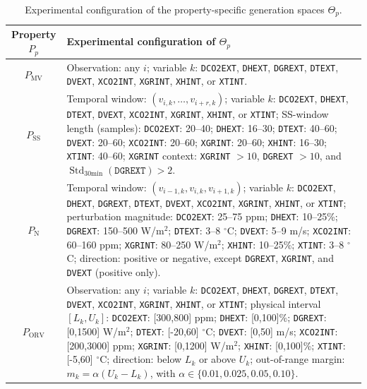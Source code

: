 \documentclass[preprint,12pt]{elsarticle}
\begin{document}
\begin{table}[!t]
\caption{Experimental configuration of the property-specific generation
spaces \(\Theta_p\).}
\label{tab:pbt_generation_config}
\centering

{\scriptsize
\setlength{\tabcolsep}{3pt}
\begin{tabular}{|c|p{10.7cm}|}
\hline
\textbf{Property \(P_p\)} &
\textbf{Experimental configuration of \(\Theta_p\)} \\
\hline
\hline

\(P_{\mathrm{MV}}\) &
Observation: any \(i\);
variable \(k\): \texttt{DCO2EXT}, \texttt{DHEXT}, \texttt{DGREXT},
\texttt{DTEXT}, \texttt{DVEXT}, \texttt{XCO2INT}, \texttt{XGRINT},
\texttt{XHINT}, or \texttt{XTINT}. \\
\hline

\(P_{\mathrm{SS}}\) &
Temporal window: \((v_{i,k},\ldots,v_{i+r,k})\);
variable \(k\): \texttt{DCO2EXT}, \texttt{DHEXT}, \texttt{DTEXT},
\texttt{DVEXT}, \texttt{XCO2INT}, \texttt{XGRINT}, \texttt{XHINT},
or \texttt{XTINT};
SS-window length (samples):
\texttt{DCO2EXT}: 20--40;
\texttt{DHEXT}: 16--30;
\texttt{DTEXT}: 40--60;
\texttt{DVEXT}: 20--60;
\texttt{XCO2INT}: 20--60;
\texttt{XGRINT}: 20--60;
\texttt{XHINT}: 16--30;
\texttt{XTINT}: 40--60;
\texttt{XGRINT} context:
\texttt{XGRINT} \(>10\),
\texttt{DGREXT} \(>10\), and
\(\operatorname{Std}_{30\mathrm{min}}(\texttt{DGREXT})>2\).\\
\hline

\(P_{\mathrm{N}}\) &
Temporal window: \((v_{i-1,k},v_{i,k},v_{i+1,k})\);
variable \(k\): \texttt{DCO2EXT}, \texttt{DHEXT}, \texttt{DGREXT},
\texttt{DTEXT}, \texttt{DVEXT}, \texttt{XCO2INT}, \texttt{XGRINT},
\texttt{XHINT}, or \texttt{XTINT};
perturbation magnitude:
\texttt{DCO2EXT}: 25--75 ppm;
\texttt{DHEXT}: 10--25\%;
\texttt{DGREXT}: 150--500 W/m$^2$;
\texttt{DTEXT}: 3--8 $^\circ$C;
\texttt{DVEXT}: 5--9 m/s;
\texttt{XCO2INT}: 60--160 ppm;
\texttt{XGRINT}: 80--250 W/m$^2$;
\texttt{XHINT}: 10--25\%;
\texttt{XTINT}: 3--8 $^\circ$C;
direction: positive or negative, except
\texttt{DGREXT}, \texttt{XGRINT}, and \texttt{DVEXT} (positive only). \\
\hline

\(P_{\mathrm{ORV}}\) &
Observation: any \(i\);
variable \(k\): \texttt{DCO2EXT}, \texttt{DHEXT}, \texttt{DGREXT},
\texttt{DTEXT}, \texttt{DVEXT}, \texttt{XCO2INT}, \texttt{XGRINT},
\texttt{XHINT}, or \texttt{XTINT};
physical interval \([L_k,U_k]\):
\texttt{DCO2EXT}: [300,800] ppm;
\texttt{DHEXT}: [0,100]\%;
\texttt{DGREXT}: [0,1500] W/m$^2$;
\texttt{DTEXT}: [-20,60] $^\circ$C;
\texttt{DVEXT}: [0,50] m/s;
\texttt{XCO2INT}: [200,3000] ppm;
\texttt{XGRINT}: [0,1200] W/m$^2$;
\texttt{XHINT}: [0,100]\%;
\texttt{XTINT}: [-5,60] $^\circ$C;
direction: below \(L_k\) or above \(U_k\);
out-of-range margin: \(m_k=\alpha(U_k-L_k)\), with
\(\alpha\in\{0.01,0.025,0.05,0.10\}\). \\
\hline


\end{tabular}}
\end{table}
\end{document}

